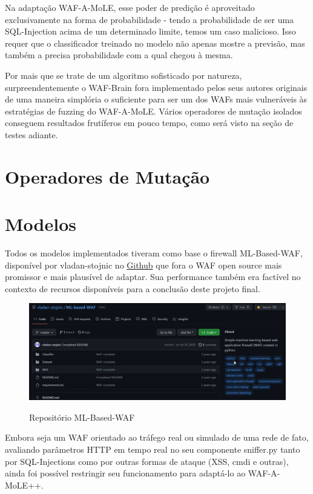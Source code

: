 Na adaptação WAF-A-MoLE, esse poder de predição é aproveitado exclusivamente na forma de probabilidade - tendo a probabilidade de ser uma SQL-Injection acima de um determinado limite, temos um caso malicioso. Isso requer que o classificador treinado no modelo não apenas mostre a previsão, mas também a precisa probabilidade com a qual chegou à mesma.

Por mais que se trate de um algoritmo sofisticado por natureza, surpreendentemente o WAF-Brain fora implementado pelos seus autores originais de uma maneira simplória o suficiente para ser um dos WAFs mais vulneráveis às estratégias de fuzzing do WAF-A-MoLE. Vários operadores de mutação isolados conseguem resultados frutíferos em pouco tempo, como será visto na seção de testes adiante.

\section{Operadores de Mutação}

\section{Modelos}
Todos os modelos implementados tiveram como base o firewall ML-Based-WAF, disponível por vladan-stojnic no \href{https://github.com/vladan-stojnic/ML-based-WAF}{Github} que fora o WAF open source mais promissor e mais plausível de adaptar. Sua performance também era factível no contexto de recursos disponíveis para a conclusão deste projeto final.

\begin{figure}[ht]
    \centering
    \caption{Repositório ML-Based-WAF}
    \includegraphics[width=16cm]{figuras/MLBasedWAF.png} 
    \label{fig:internet} 
\end{figure}

Embora seja um WAF orientado ao tráfego real ou simulado de uma rede de fato, avaliando parâmetros HTTP em tempo real no seu componente sniffer.py tanto por SQL-Injections como por outras formas de ataque (XSS, cmdi e outras), ainda foi possível restringir seu funcionamento para adaptá-lo ao WAF-A-MoLE++. 

